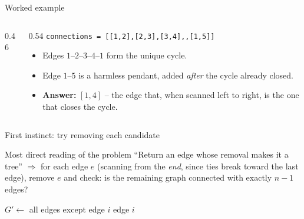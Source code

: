 \documentclass[11pt,aspectratio=169]{beamer}
\begin{document}
\begin{frame}{Worked example}
  \begin{columns}
  \begin{column}{0.46\textwidth}
  \begin{center}
  \end{center}
  \end{column}
  \begin{column}{0.54\textwidth}
  \small
  \texttt{connections = [[1,2],[2,3],[3,4],\allowbreak[1,4],[1,5]]}
  \begin{itemize}
    \item Edges $1$--$2$--$3$--$4$--$1$ form the unique cycle.
    \item Edge $1$--$5$ is a harmless pendant, added \emph{after} the cycle already
    closed.
    \item \textbf{Answer:} $[1,4]$ -- the edge that, when scanned left to right, is the
    one that closes the cycle.
  \end{itemize}
  \end{column}
  \end{columns}
\end{frame}

\begin{frame}{First instinct: try removing each candidate}
  \begin{block}{Most direct reading of the problem}
    ``Return an edge whose removal makes it a tree'' $\Rightarrow$ for each edge $e$
    (scanning from the \emph{end}, since ties break toward the last edge), remove $e$
    and check: is the remaining graph connected with exactly $n-1$ edges?
  \end{block}
  \begin{algorithmic}[1]
     
      \State $G' \gets$ all edges except edge $i$
        \State \Return edge $i$
      \EndIf
    \EndFor
  \end{algorithmic}
\end{frame}
\end{document}
